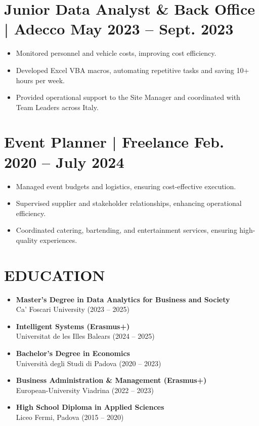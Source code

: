 \documentclass[a4paper,10pt]{article}
\newcommand{\datedsection}[2]{%
  \section*{#1 \hfill \small #2}%
}
\begin{document}
\datedsection{Junior Data Analyst \& Back Office | Adecco}{May 2023 -- Sept. 2023}
\begin{itemize}[leftmargin=*, label={$\bullet$}]
    \item Monitored personnel and vehicle costs, improving cost efficiency.
    \item Developed Excel VBA macros, automating repetitive tasks and saving 10+ hours per week.
    \item Provided operational support to the Site Manager and coordinated with Team Leaders across Italy.
\end{itemize}

\datedsection{Event Planner | Freelance}{Feb. 2020 -- July 2024}
\begin{itemize}[leftmargin=*, label={$\bullet$}]
    \item Managed event budgets and logistics, ensuring cost-effective execution.
    \item Supervised supplier and stakeholder relationships, enhancing operational efficiency.
    \item Coordinated catering, bartending, and entertainment services, ensuring high-quality experiences.
\end{itemize}

\section*{EDUCATION}
\begin{itemize}[leftmargin=*, label={$\bullet$}]
    \item \textbf{Master's Degree in Data Analytics for Business and Society} \\
          Ca' Foscari University (2023 -- 2025)
    \item \textbf{Intelligent Systems (Erasmus+)} \\
          Universitat de les Illes Balears (2024 -- 2025)
    \item \textbf{Bachelor's Degree in Economics} \\
          Università degli Studi di Padova (2020 -- 2023)
    \item \textbf{Business Administration \& Management (Erasmus+)} \\
          European-University Viadrina (2022 -- 2023)
    \item \textbf{High School Diploma in Applied Sciences} \\
          Liceo Fermi, Padova (2015 -- 2020)
\end{itemize}
\end{document}

